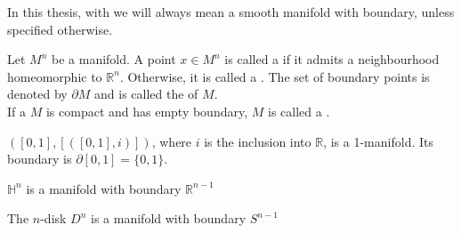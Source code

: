 \documentclass[a4paper,11pt]{article}
\begin{document}
\begin{comment}
\begin{definition}[Manifold]
    A \demph{smooth manifold with boundary} \(M=(M,[\mathcal{A}])\) is the data of a topological space \(M\) and an equivalence class \([\mathcal{A}]\) of smooth atlases such that:
    \begin{itemize}
        \item \(M\) is Hausdorff,
        \item \(M\) is second countable,
        \item \(\mathcal{A}\) is locally finite.
    \end{itemize}
\end{definition}
\end{comment}

\begin{remark}
    In this thesis, with  we will always mean a smooth manifold with boundary, unless specified otherwise.
\end{remark}

\begin{definition}
    Let \(M^n\) be a manifold. A point \(x\in M^n\) is called a  if it admits a neighbourhood homeomorphic to \(\mathbb{R}^n\). Otherwise, it is called a . The set of boundary points is denoted by \(\partial M\) and is called the  of \(M\).\\
    If a \(M\) is compact and has empty boundary, \(M\) is called a . %
\end{definition}

\begin{example}
    \(([0,1],[([0,1],i)])\), where \(i\) is the inclusion into \(\mathbb{R}\), is a 1-manifold. Its boundary is \(\partial [0,1]=\{0,1\}\).
\end{example}

\begin{example}
    \(\mathbb{H}^n\) is a manifold with boundary \(\mathbb{R}^{n-1}\)
\end{example}

\begin{example}
    The \(n\)-disk \(D^n\) is a manifold with boundary \(S^{n-1}\)
\end{example}
\end{document}
